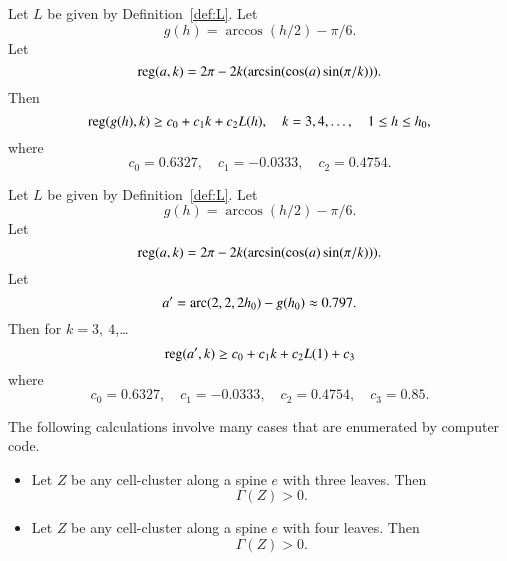 \begin{calculation}\label{calc:cc:alin}
Let $L$ be given by Definition~\ref{def:L}.
Let
\begin{displaymath}
g(h) = \arccos(h/2) - \pi/6.
\end{displaymath}
Let
\begin{displaymath}
{\operatorname{reg}}(a,k) = 2\pi - 2 k (\arcsin(\cos(a)\sin(\pi/k))).
\end{displaymath}
Then
\begin{displaymath}
{\operatorname{reg}}(g(h),k) \ge c_0 + c_1 k + c_2 L(h),\quad
k = 3,4,\ldots,\quad 1\le h\le {h_0},
\end{displaymath}
where
\begin{displaymath}c_0 = 0.6327,\quad c_1 = -0.0333,\quad c_2 =
0.4754.\end{displaymath}
\end{calculation}

\begin{calculation}\label{calc:cc:alin2}
Let $L$ be given by Definition~\ref{def:L}.
Let
\begin{displaymath}
g(h) = \arccos(h/2) - \pi/6.
\end{displaymath}
Let
\begin{displaymath}
{\operatorname{reg}}(a,k) = 2\pi - 2 k (\arcsin(\cos(a)\sin(\pi/k))).
\end{displaymath}
Let
\begin{displaymath}a'=\operatorname{arc}(2,2,2{h_0})-g({h_0}) \approx
0.797.\end{displaymath} Then for $k=3,~4$,\dots
\begin{displaymath}{\operatorname{reg}}(a',k) \ge c_0 + c_1 k + c_2 L(1) +
c_3\end{displaymath}
where 
\begin{displaymath}c_0 = 0.6327,\quad c_1 = -0.0333,\quad c_2 =
0.4754,\quad c_3 = 0.85.\end{displaymath}
\end{calculation}

\begin{calculation}\label{calc:shorts}
The following calculations involve many cases that are enumerated by
computer code.
\begin{itemize}
\item {} Let $Z$ be any cell-cluster along a spine $e$
with three leaves.  Then
\begin{displaymath}
\Gamma(Z)> 0.
\end{displaymath}
\item {} Let $Z$ be any cell-cluster along a spine $e$
with four leaves.  Then
\begin{displaymath}
\Gamma(Z)> 0.
\end{displaymath}
\end{itemize}
\end{calculation}



